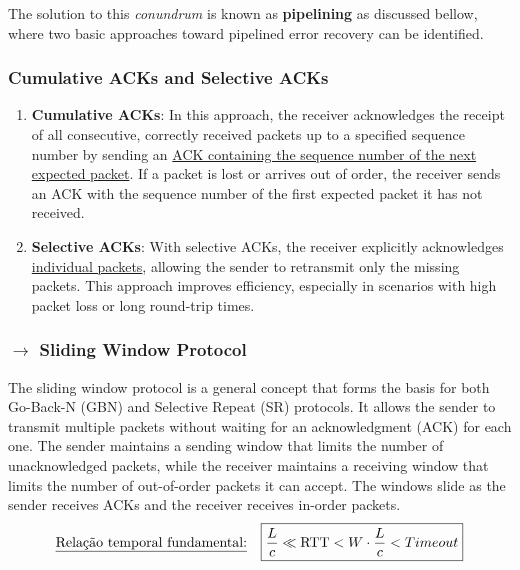 \noindent The solution to this \textit{conundrum} is known as \textbf{pipelining} as discussed bellow, where two basic approaches toward pipelined error recovery can be identified.

\subsubsection[3.4.2 Cumulative ACKs and Selective ACKs]{\hspace*{0.075 em}\raisebox{0.2 em}{$\pmb{\rightarrow}$} Cumulative ACKs and Selective ACKs}
\label{subsec:cumulative-acks-selective-acks}

\vspace{-0.5em}
\begin{enumerate}
    \item \textbf{Cumulative ACKs}: In this approach, the receiver acknowledges the receipt of all consecutive, correctly received packets up to a specified sequence number by sending an \underline{ACK containing the sequence number of the next expected packet}. If a packet is lost or arrives out of order, the receiver sends an ACK with the sequence number of the first expected packet it has not received.
    
    \item \textbf{Selective ACKs}: With selective ACKs, the receiver explicitly acknowledges \underline{individual packets}, allowing the sender to retransmit only the missing packets. This approach improves efficiency, especially in scenarios with high packet loss or long round-trip times.
\end{enumerate}

\subsubsection[3.4.3 Sliding Window Protocol]{$\pmb{\rightarrow}$ Sliding Window Protocol}

The sliding window protocol is a general concept that forms the basis for both Go-Back-N (GBN) and Selective Repeat (SR) protocols. It allows the sender to transmit multiple packets without waiting for an acknowledgment (ACK) for each one. The sender maintains a sending window that limits the number of unacknowledged packets, while the receiver maintains a receiving window that limits the number of out-of-order packets it can accept. The windows slide as the sender receives ACKs and the receiver receives in-order packets.
$$
    \text{\underline{Relação temporal fundamental:}} \quad \boxed{\frac{L}{c} \ll \text{RTT} < W \cdot \frac{L}{c} < Timeout}
$$

